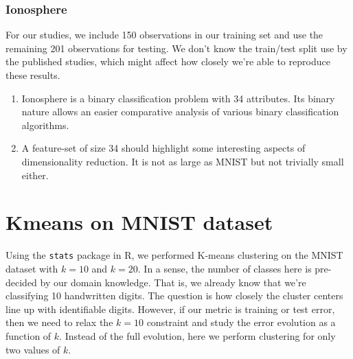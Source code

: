 \documentclass[10pt,letterpaper]{article}
\begin{document}
\subsubsection*{Ionosphere}
For our studies, we include 150 observations in our training set and use the remaining 201 observations for testing. We don't know the train/test split use by the published studies, which might affect how closely we're able to reproduce these results.
\begin{enumerate}
	\item Ionosphere is a binary classification problem with 34 attributes. Its binary nature allows an easier comparative analysis of various binary classification algorithms.  
	\item A feature-set of size 34 should highlight some interesting aspects of dimensionality reduction. It is not as large as MNIST but not trivially small either. 
\end{enumerate}
\section{Kmeans on MNIST dataset}
Using the {\tt stats} package in R, we performed K-means clustering on the MNIST dataset with $k=10$ and $k=20$. In a sense, the number of classes here is pre-decided by our domain knowledge. That is, we already know that we're classifying 10 handwritten digits. The question is how closely the cluster centers line up with identifiable digits. However, if our metric is training or test error, then we need to relax the $k=10$ constraint and study the error evolution as a function of $k$. Instead of the full evolution, here we perform clustering for only two values of $k$. 
\end{document}
